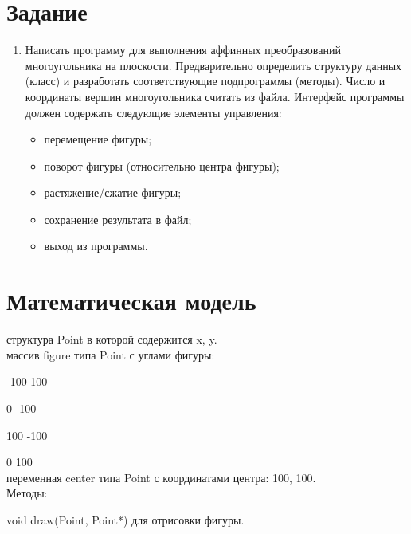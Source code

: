 \documentclass[14pt, a4paper]{extreport}
\begin{document}
\author{Алиев~Э.Ф.}
\maketitle

\chapter{Задание}

\begin{enumerate}

	\item
Написать программу для выполнения аффинных преобразований многоугольника на плоскости. Предварительно определить структуру данных (класс) и разработать соответствующие подпрограммы (методы). Число и координаты вершин многоугольника считать из файла. Интерфейс программы должен содержать следующие элементы управления:
	\begin{itemize}
		\item перемещение фигуры;
		\item поворот фигуры (относительно центра фигуры);
		\item растяжение/сжатие фигуры;
		\item сохранение результата в файл;
		\item выход из программы.
	\end{itemize}

\end{enumerate}

\chapter{Математическая модель}

структура Point в которой содержится x, y.\\
массив figure типа Point с углами фигуры:

-100 100

0 -100

100 -100

0 100\\
переменная center типа Point с координатами центра: 100, 100.\\
Методы:

void draw(Point, Point*) для отрисовки фигуры.
\end{document}
